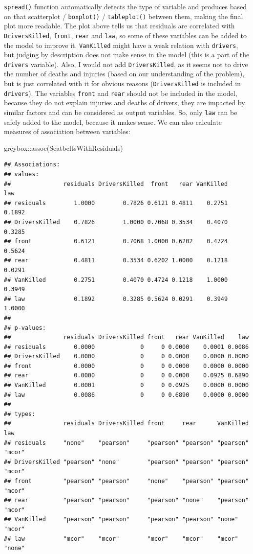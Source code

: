 \documentclass[
]{book}
\newenvironment{Shaded}{\begin{snugshade}}{\end{snugshade}}
\newcommand{\FunctionTok}[1]{\textcolor[rgb]{0.00,0.00,0.00}{#1}}
\newcommand{\NormalTok}[1]{#1}
\newcommand{\SpecialCharTok}[1]{\textcolor[rgb]{0.00,0.00,0.00}{#1}}
\theoremstyle{definition}
\theoremstyle{definition}
\theoremstyle{definition}
\theoremstyle{definition}
\theoremstyle{remark}
\begin{document}
\texttt{spread()} function automatically detects the type of variable and produces based on that scatterplot / \texttt{boxplot()} / \texttt{tableplot()} between them, making the final plot more readable. The plot above tells us that residuals are correlated with \texttt{DriversKilled}, \texttt{front}, \texttt{rear} and \texttt{law}, so some of these variables can be added to the model to improve it. \texttt{VanKilled} might have a weak relation with \texttt{drivers}, but judging by description does not make sense in the model (this is a part of the \texttt{drivers} variable). Also, I would not add \texttt{DriversKilled}, as it seems not to drive the number of deaths and injuries (based on our understanding of the problem), but is just correlated with it for obvious reasons (\texttt{DriversKilled} is included in \texttt{drivers}). The variables \texttt{front} and \texttt{rear} should not be included in the model, because they do not explain injuries and deaths of drivers, they are impacted by similar factors and can be considered as output variables. So, only \texttt{law} can be safely added to the model, because it makes sense. We can also calculate measures of association between variables:

\begin{Shaded}
\begin{Highlighting}[]
\NormalTok{greybox}\SpecialCharTok{::}\FunctionTok{assoc}\NormalTok{(SeatbeltsWithResiduals)}
\end{Highlighting}
\end{Shaded}

\begin{verbatim}
## Associations: 
## values:
##               residuals DriversKilled  front   rear VanKilled    law
## residuals        1.0000        0.7826 0.6121 0.4811    0.2751 0.1892
## DriversKilled    0.7826        1.0000 0.7068 0.3534    0.4070 0.3285
## front            0.6121        0.7068 1.0000 0.6202    0.4724 0.5624
## rear             0.4811        0.3534 0.6202 1.0000    0.1218 0.0291
## VanKilled        0.2751        0.4070 0.4724 0.1218    1.0000 0.3949
## law              0.1892        0.3285 0.5624 0.0291    0.3949 1.0000
## 
## p-values:
##               residuals DriversKilled front   rear VanKilled    law
## residuals        0.0000             0     0 0.0000    0.0001 0.0086
## DriversKilled    0.0000             0     0 0.0000    0.0000 0.0000
## front            0.0000             0     0 0.0000    0.0000 0.0000
## rear             0.0000             0     0 0.0000    0.0925 0.6890
## VanKilled        0.0001             0     0 0.0925    0.0000 0.0000
## law              0.0086             0     0 0.6890    0.0000 0.0000
## 
## types:
##               residuals DriversKilled front     rear      VanKilled law   
## residuals     "none"    "pearson"     "pearson" "pearson" "pearson" "mcor"
## DriversKilled "pearson" "none"        "pearson" "pearson" "pearson" "mcor"
## front         "pearson" "pearson"     "none"    "pearson" "pearson" "mcor"
## rear          "pearson" "pearson"     "pearson" "none"    "pearson" "mcor"
## VanKilled     "pearson" "pearson"     "pearson" "pearson" "none"    "mcor"
## law           "mcor"    "mcor"        "mcor"    "mcor"    "mcor"    "none"
\end{verbatim}
\end{document}
